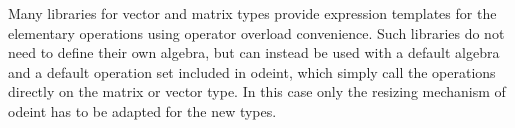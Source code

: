 \documentclass[final]{siamltex}
\newcommand{\code}[1]{\lstinline|#1|}
\begin{document}



Many libraries for vector and matrix types provide expression
templates \cite{Veldhuizen:ExpressionTemplates, Veldhuizen:Techniques,
Vandevoorde:CppTemplates} for the elementary operations using operator overload
convenience.
Such libraries do not need to define their own algebra,
but can instead be used with a default algebra
and a default operation set included in odeint,
which simply call the operations directly on the matrix or vector type.
In this case only the resizing mechanism of odeint has to be adapted for the new types.
\end{document}
